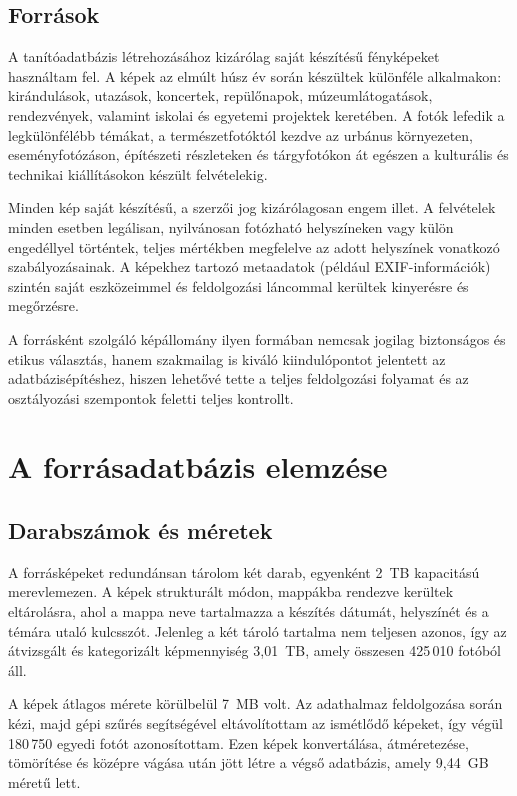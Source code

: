        \subsection{Források}
            A tanítóadatbázis létrehozásához kizárólag saját készítésű fényképeket használtam fel. A képek az elmúlt húsz év során készültek különféle alkalmakon: kirándulások, utazások, koncertek, repülőnapok, múzeumlátogatások, rendezvények, valamint iskolai és egyetemi projektek keretében. A fotók lefedik a legkülönfélébb témákat, a természetfotóktól kezdve az urbánus környezeten, eseményfotózáson, építészeti részleteken és tárgyfotókon át egészen a kulturális és technikai kiállításokon készült felvételekig.
            
            Minden kép saját készítésű, a szerzői jog kizárólagosan engem illet. A felvételek minden esetben legálisan, nyilvánosan fotózható helyszíneken vagy külön engedéllyel történtek, teljes mértékben megfelelve az adott helyszínek vonatkozó szabályozásainak. A képekhez tartozó metaadatok (például EXIF-információk) szintén saját eszközeimmel és feldolgozási láncommal kerültek kinyerésre és megőrzésre.
            
            A forrásként szolgáló képállomány ilyen formában nemcsak jogilag biztonságos és etikus választás, hanem szakmailag is kiváló kiindulópontot jelentett az adatbázisépítéshez, hiszen lehetővé tette a teljes feldolgozási folyamat és az osztályozási szempontok feletti teljes kontrollt.
            
    \section{A forrásadatbázis elemzése}
        \subsection{Darabszámok és méretek}
            A forrásképeket redundánsan tárolom két darab, egyenként 2~TB kapacitású merevlemezen. A képek strukturált módon, mappákba rendezve kerültek eltárolásra, ahol a mappa neve tartalmazza a készítés dátumát, helyszínét és a témára utaló kulcsszót. Jelenleg a két tároló tartalma nem teljesen azonos, így az átvizsgált és kategorizált képmennyiség 3{,}01~TB, amely összesen 425\,010 fotóból áll.
            
            A képek átlagos mérete körülbelül 7~MB volt. Az adathalmaz feldolgozása során kézi, majd gépi szűrés segítségével eltávolítottam az ismétlődő képeket, így végül 180\,750 egyedi fotót azonosítottam. Ezen képek konvertálása, átméretezése, tömörítése és középre vágása után jött létre a végső adatbázis, amely 9{,}44~GB méretű lett. 
            
